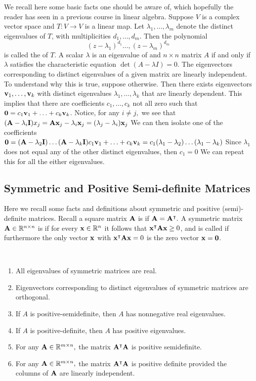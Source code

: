 We recall here some basic facts one should be aware of, which hopefully the reader has seen in a previous course in linear algebra. Suppose $V$ is a complex vector space and $T:V\to V$ is a linear map. Let $\lambda_1, \ldots, \lambda_m$ denote the distinct eigenvalues of $T$, with multiplicities $d_1, \ldots, d_m$. Then the polynomial 
$$(z - \lambda_1)^{d_1} \ldots, (z - \lambda_m)^{d_m}$$
is called the  of $T$. 
A scalar $\lambda$ is an eigenvalue of and $n \times n$ matrix $A$ if and only if $\lambda$ satisfies the characteristic equation 
$\det(A - \lambda I) = 0$.
The eigenvectors corresponding to distinct eigenvalues of a given matrix are linearly independent.
To understand why this is true,
suppose otherwise. Then there exists eigenvectors $\vv_1, \ldots, \vv_k$ with distinct eigenvalues $\lambda_1, \ldots, \lambda_k$ that are linearly dependent. This implies that there are coefficients $c_1, \ldots, c_k$ not all zero such that 
$\vzero = c_1 \vv_1 + \ldots + c_k \vv_k$. 
Notice, for any $i \not = j,$ we see that 
$(\MA - \lambda_i \MI) x_j = \MA\vx_j - \lambda_i \vx_j = (\lambda_j - \lambda_i) \vx_j$
We can then isolate one of the coefficients 
$\vzero = (\MA - \lambda_2 \MI) \ldots (\MA - \lambda_k \MI)c_1 \vv_1 + \ldots + c_k \vv_k = c_1 (\lambda_1 - \lambda_2) \ldots (\lambda_1 - \lambda_k) $
Since $\lambda_1$ does not equal any of the other distinct eigenvalues, then 
$c_1 = 0$
We can repeat this for all the either eigenvalues. 


\subsection{Symmetric and Positive Semi-definite Matrices}

Here we recall some facts and definitions about symmetric and positive (semi)-definite matrices. 
Recall a square matrix $\MA$ is  if $\MA = \MA^\intercal.$ 
A symmetric matrix $\MA \in \R^{n \times n}$ is  if for every $\vx \in \R^n$ it follows that $\vx^\intercal \MA \vx \geq 0$, and is called  if furthermore the only vector $\vx$ with $\vx^\intercal\MA\vx = 0$ is the zero vector $\vx =\vzero$.


\begin{theorem}\ 
\begin{enumerate}
    \item All eigenvalues of symmetric matrices are real. 
    \item Eigenvectors corresponding to distinct eigenvalues of symmetric matrices are orthogonal.
    \item If $A$ is positive-semidefinite, then $A$ has nonnegative real eigenvalues.
    \item If $A$ is positive-definite, then $A$ has positive eigenvalues.
    \item For any $\MA \in \R^{m \times n},$ the matrix $\MA^\intercal \MA$ is positive semidefinite. 
    \item For any $\MA \in \R^{m \times n},$ the matrix $\MA^\intercal \MA$ is positive definite provided the columns of $\MA$ are linearly independent. 
\end{enumerate}
\end{theorem}

